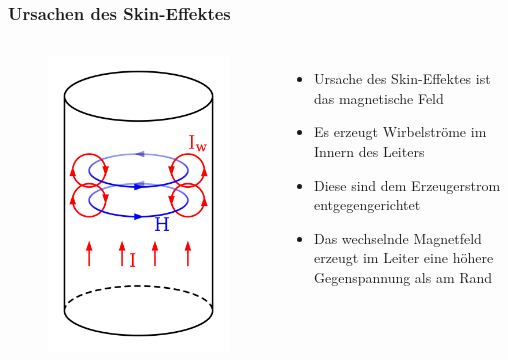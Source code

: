 \begin{frame}
  \frametitle{Ursachen des Skin-Effektes}
  \begin{columns}
    \begin{center}
      \begin{figure}
        \includegraphics[width=\textwidth,height=.75\textheight,keepaspectratio]{a02/Skineffect.png}\\
      \end{figure}
    \end{center}
    \begin{itemize}
      \item Ursache des Skin-Effektes ist das magnetische Feld
      \item Es erzeugt Wirbelströme im Innern des Leiters
      \item Diese sind dem Erzeugerstrom entgegengerichtet
      \item Das wechselnde Magnetfeld erzeugt im Leiter eine höhere Gegenspannung als am Rand
    \end{itemize}
  \end{columns}
\end{frame}

